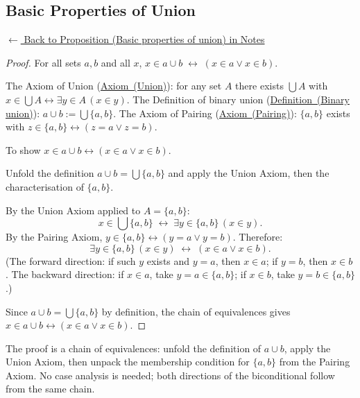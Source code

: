
\subsection*{Basic Properties of Union}
\label{prf:union-basics}

\begin{remark*}[Return]
\hyperref[prop:union-basics]{$\leftarrow$ Back to Proposition (Basic properties of union) in Notes}
\end{remark*}

\begin{proof}
\Claim For all sets $a, b$ and all $x$, $x \in a \cup b \;\leftrightarrow\; (x \in a \lor x \in b)$.

\Given The Axiom of Union (\hyperref[ax:zf-union]{Axiom~(Union)}): for any set
$A$ there exists $\bigcup A$ with $x \in \bigcup A \leftrightarrow \exists y \in
A\,(x \in y)$. The Definition of binary union
(\hyperref[def:binary-union]{Definition~(Binary union)}): $a \cup b := \bigcup
\{a, b\}$. The Axiom of Pairing (\hyperref[ax:vn-pairing]{Axiom~(Pairing)}):
$\{a, b\}$ exists with $z \in \{a, b\} \leftrightarrow (z = a \lor z = b)$.

\Goal To show $x \in a \cup b \leftrightarrow (x \in a \lor x \in b)$.

\Strategy Unfold the definition $a \cup b = \bigcup \{a, b\}$ and apply the
Union Axiom, then the characterisation of $\{a, b\}$.

\medskip
By the Union Axiom applied to $A = \{a, b\}$:
\[
x \in \bigcup\{a, b\}
\;\leftrightarrow\;
\exists y \in \{a, b\}\,(x \in y).
\]
By the Pairing Axiom, $y \in \{a, b\} \leftrightarrow (y = a \lor y = b)$.
Therefore:
\[
\exists y \in \{a, b\}\,(x \in y)
\;\leftrightarrow\;
(x \in a \lor x \in b).
\]
(The forward direction: if such $y$ exists and $y = a$, then $x \in a$; if $y =
b$, then $x \in b$. The backward direction: if $x \in a$, take $y = a \in
\{a,b\}$; if $x \in b$, take $y = b \in \{a,b\}$.)

Since $a \cup b = \bigcup\{a, b\}$ by definition, the chain of equivalences
gives $x \in a \cup b \leftrightarrow (x \in a \lor x \in b)$. \AsReq
\end{proof}

\begin{remark*}
The proof is a chain of equivalences: unfold the definition of $a \cup b$,
apply the Union Axiom, then unpack the membership condition for $\{a, b\}$ from
the Pairing Axiom. No case analysis is needed; both directions of the
biconditional follow from the same chain.
\end{remark*}

